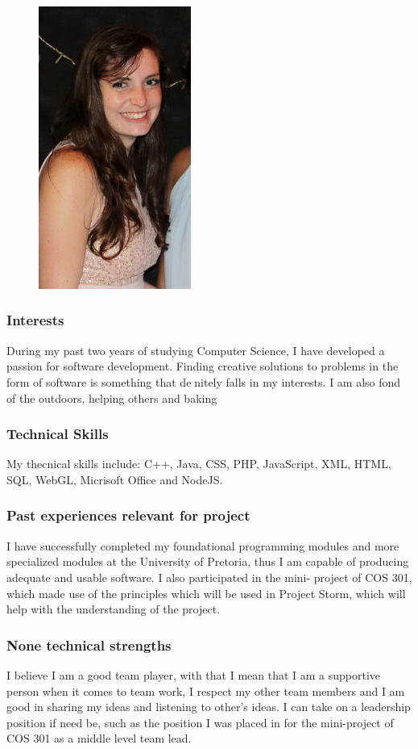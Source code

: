 \documentclass[hidelinks, 12pt, oneside]{article}
\begin{document}
\begin{figure}[ht!]
\centering
\includegraphics[width=50mm]{IsabelNel}
\end{figure}

\subsubsection{Interests}
During my past two years of studying Computer Science, I have developed a
passion for software development. Finding creative solutions to problems in
the form of software is something that denitely falls in my interests. I am
also fond of the outdoors, helping others and baking

\subsubsection{Technical Skills}
My thecnical skills include: C++, Java, CSS, PHP, JavaScript, XML, HTML,
SQL, WebGL, Micrisoft Office and NodeJS.

\subsubsection{Past experiences relevant for project}
I have successfully completed my foundational programming modules and
more specialized modules at the University of Pretoria, thus I am capable
of producing adequate and usable software. I also participated in the mini-
project of COS 301, which made use of the principles which will be used in
Project Storm, which will help with the understanding of the project.

\subsubsection{None technical strengths}
I believe I am a good team player, with that I mean that I am a supportive
person when it comes to team work, I respect my other team members and
I am good in sharing my ideas and listening to other's ideas. I can take on
a leadership position if need be, such as the position I was placed in for the
mini-project of COS 301 as a middle level team lead.
\end{document}
